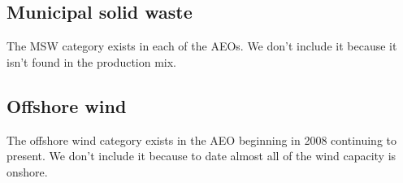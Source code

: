 \documentclass[10pt]{report}
\begin{document}
\subsection{Municipal solid waste}
The MSW category exists in each of the AEOs. 
We don't include it because it isn't found in the production mix. 

\subsection{Offshore wind}
The offshore wind category exists in the AEO beginning in 2008 continuing to present.  
We don't include it because to date almost all of the wind capacity is onshore.
\end{document}
